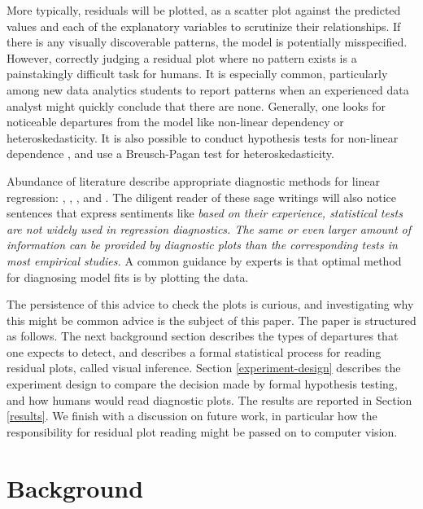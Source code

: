 \documentclass[]{interact}
\theoremstyle{plain}%
\theoremstyle{definition}
\theoremstyle{remark}
\begin{document}
More typically, residuals will be plotted, as a scatter plot against the
predicted values and each of the explanatory variables to scrutinize
their relationships. If there is any visually discoverable patterns, the
model is potentially misspecified. However, correctly judging a residual
plot where no pattern exists is a painstakingly difficult task for
humans. It is especially common, particularly among new data analytics
students to report patterns when an experienced data analyst might
quickly conclude that there are none. Generally, one looks for
noticeable departures from the model like non-linear dependency or
heteroskedasticity. It is also possible to conduct hypothesis tests for
non-linear dependence \citep{ramsey_tests_1969}, and use a Breusch-Pagan
test \citep{breusch_simple_1979} for heteroskedasticity.

Abundance of literature describe appropriate diagnostic methods for
linear regression: \citet{draper1998applied},
\citet{montgomery1982introduction}, \citet{belsley_regression_1980},
\citet{cook_applied_1999} and \citet{cook1982residuals}. The diligent
reader of these sage writings will also notice sentences that express
sentiments like \emph{based on their experience, statistical tests are
not widely used in regression diagnostics. The same or even larger
amount of information can be provided by diagnostic plots than the
corresponding tests in most empirical studies.} A common guidance by
experts is that optimal method for diagnosing model fits is by plotting
the data.

The persistence of this advice to check the plots is curious, and
investigating why this might be common advice is the subject of this
paper. The paper is structured as follows. The next background section
describes the types of departures that one expects to detect, and
describes a formal statistical process for reading residual plots,
called visual inference. Section \ref{experiment-design} describes the
experiment design to compare the decision made by formal hypothesis
testing, and how humans would read diagnostic plots. The results are
reported in Section \ref{results}. We finish with a discussion on future
work, in particular how the responsibility for residual plot reading
might be passed on to computer vision.

\hypertarget{background}{%
\section{Background}\label{background}}
\end{document}
